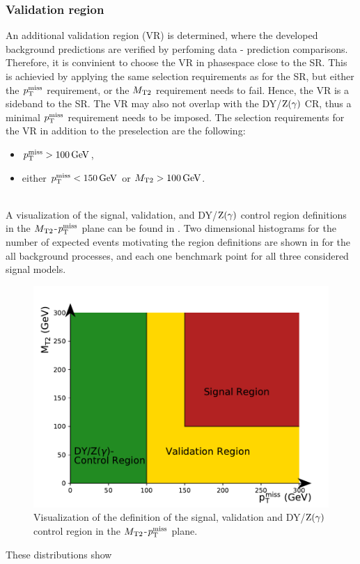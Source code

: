 \subsubsection{Validation region}
An additional validation region (VR) is determined, where the developed background predictions are verified by perfoming data - prediction comparisons. Therefore, it is convinient to choose the VR in phasespace close to the SR. This is achievied by applying the same selection requirements as for the SR, but either the $p_{\mathrm{T}}^\text{miss}$ requirement, or the $M_{\mathrm{T2}}$ requirement needs to fail. Hence, the VR is a sideband to the SR. The VR may also not overlap with the DY/$\mathrm{Z}(\gamma)$ CR, thus a minimal $p_{\mathrm{T}}^\text{miss}$ requirement needs to be imposed. The selection requirements for the VR in addition to the preselection are the following:
\begin{itemize}
 \item $p_{\mathrm{T}}^\text{miss}>100\,\text{Ge\hspace{-.08em}V}$,
 \item either $p_{\mathrm{T}}^\text{miss}<150\,\text{Ge\hspace{-.08em}V}$ or $M_{\mathrm{T2}}>100\,\text{Ge\hspace{-.08em}V}$.
\end{itemize}
\\
A visualization of the signal, validation, and DY/$\mathrm{Z}(\gamma)$ control region definitions in the $M_{\mathrm{T2}}$-$p_{\mathrm{T}}^\text{miss}$ plane can be found in . Two dimensional histograms for the number of expected events motivating the region definitions are shown in  for the all background processes, and each one benchmark point for all three considered signal models.
\begin{figure}[htb]
 \centering
 \includegraphics[width=\pairwidth]{figures/figures/regions}
 \caption{Visualization of the definition of the signal, validation and DY/$\mathrm{Z}(\gamma)$ control region in the $M_{\mathrm{T2}}$-$p_{\mathrm{T}}^\text{miss}$ plane.}
 \label{fig:Regions}
\end{figure}
These distributions show 

